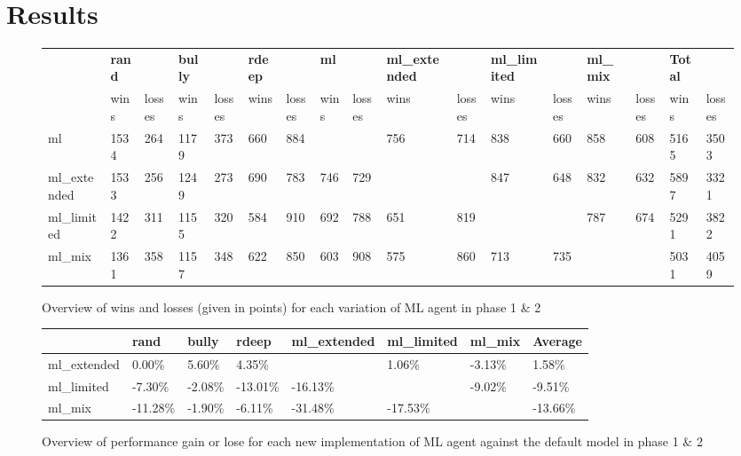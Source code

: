 \documentclass[master]{subfiles}
\begin{document}
\section{Results}

\begin{figure}
\centering
\begin{adjustwidth}{-100pt}{}

\begin{tabular}{ | l | l l | l l | l l | l l | l l | l l | l l || l l | }
\hline
& \textbf{rand} & & \textbf{bully} & & \textbf{rdeep} & & \textbf{ml} & & \textbf{ml\_extended} & & \textbf{ml\_limited} & & \textbf{ml\_mix} & & \textbf{Total} & \\
& wins & losses & wins & losses & wins & losses  & wins & losses  & wins & losses  & wins & losses  & wins & losses  & wins & losses \\ \hline
ml & 1534 & 264 & 1179 & 373 & 660 & 884 & & & 756 & 714 & 838 & 660 & 858 & 608 & 5165 & 3503\\ \hline
ml\_extended & 1533 & 256 & 1249 & 273 & 690 & 783 & 746 & 729 & & & 847 & 648 & 832 & 632 & 5897 & 3321 \\ \hline
ml\_limited & 1422 & 311 & 1155 & 320 & 584 & 910 & 692 & 788 & 651 & 819 & & & 787 & 674 & 5291 & 3822 \\ \hline
ml\_mix & 1361 & 358 & 1157 & 348 & 622 & 850 & 603 & 908 & 575 & 860 & 713 & 735 & & & 5031 & 4059 \\ \hline
\end{tabular}

\end{adjustwidth}
\caption{Overview of wins and losses (given in points) for each variation of ML agent in phase 1 \& 2}
\label{fig:overviewp12}
\end{figure}

\begin{figure}
\centering
\begin{adjustwidth}{-0pt}{}

\begin{tabular}{ | l | l | l | l | l | l | l || l | }
\hline
& \textbf{rand} & \textbf{bully} & \textbf{rdeep} & \textbf{ml\_extended} & \textbf{ml\_limited} & \textbf{ml\_mix} & \textbf{Average} \\ \hline
ml\_extended & 0.00\% & 5.60\% & 4.35\% &  & 1.06\% & -3.13\% & 1.58\% \\ \hline
ml\_limited & -7.30\% & -2.08\% & -13.01\% & -16.13\% & & -9.02\% & -9.51\% \\ \hline
ml\_mix & -11.28\% & -1.90\% & -6.11\% & -31.48\% & -17.53\% & & -13.66\% \\ \hline
\end{tabular}

\end{adjustwidth}
\caption{Overview of performance gain or lose for each new implementation of ML agent against the default model in phase 1 \& 2}
\label{fig:overviewp12percent}
\end{figure}
\end{document}
